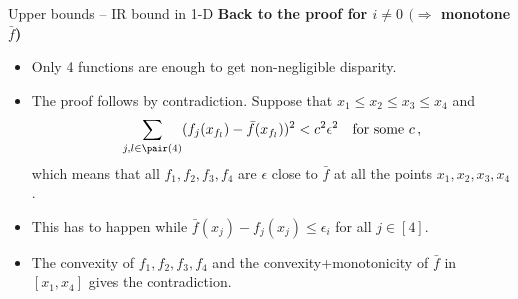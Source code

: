 \begin{frame}{Upper bounds -- IR bound in 1-D}
    \small
    \textbf{Back to the proof for $i \neq 0$ $( \Rightarrow $ monotone $\bar{f}$)}

    \begin{itemize}
        \item Only 4 functions are enough to get non-negligible disparity.
        \item The proof follows by contradiction.
              Suppose that $x_1 \leq x_2 \leq x_3 \leq x_4$ and
              \begin{align*}
                  \sum_{j,l \in \pair(4)} (f_j(x_{f_l}) - \bar f(x_{f_l}))^2 < c^2 \epsilon^2 \quad \text{for some }c\,,
              \end{align*}
              which means that all $f_1,f_2,f_3,f_4$ are $\epsilon$ close to $\bar{f}$ at all the points $x_1, x_2, x_3, x_4$.
        \item This has to happen while $\bar{f}(x_j) - f_j(x_j) \leq \epsilon_i$ for all $j\in[4]$.
        \item The convexity of $f_1,f_2,f_3,f_4$ and the convexity+monotonicity of $\bar{f}$ in $[x_1, x_4]$ gives the contradiction.
    \end{itemize}
\end{frame}